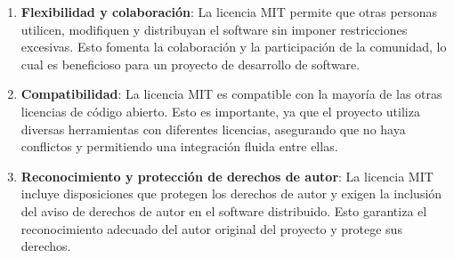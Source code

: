 \begin{enumerate}
\tightlist

\item \textbf{Flexibilidad y colaboración}: La licencia MIT \cite{Open_Source_Initiative_2023} permite que otras personas utilicen, modifiquen y distribuyan el software sin imponer restricciones excesivas. Esto fomenta la colaboración y la participación de la comunidad, lo cual es beneficioso para un proyecto de desarrollo de software.
\item \textbf{Compatibilidad}: La licencia MIT es compatible con la mayoría de las otras licencias de código abierto. Esto es importante, ya que el proyecto utiliza diversas herramientas con diferentes licencias, asegurando que no haya conflictos y permitiendo una integración fluida entre ellas.
\item \textbf{Reconocimiento y protección de derechos de autor}: La licencia MIT incluye disposiciones que protegen los derechos de autor y exigen la inclusión del aviso de derechos de autor en el software distribuido. Esto garantiza el reconocimiento adecuado del autor original del proyecto y protege sus derechos.

\end{enumerate}